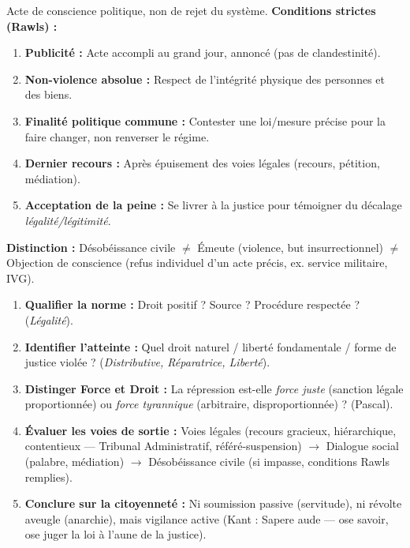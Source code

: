 \documentclass[11pt]{article}
\newcommand{\cle}[1]{{\popxbold\color{popdark}#1}}
\begin{document}
\begin{propriete}
Acte de \cle{conscience} politique, non de rejet du système. \textbf{Conditions strictes (Rawls) :}
\begin{enumerate}
    \item \textbf{Publicité :} Acte accompli au grand jour, annoncé (pas de clandestinité).
    \item \textbf{Non-violence absolue :} Respect de l'intégrité physique des personnes et des biens.
    \item \textbf{Finalité politique commune :} Contester une loi/mesure précise pour la faire changer, non renverser le régime.
    \item \textbf{Dernier recours :} Après épuisement des voies légales (recours, pétition, médiation).
    \item \textbf{Acceptation de la peine :} Se livrer à la justice pour témoigner du décalage \emph{légalité/légitimité}.
\end{enumerate}
\textbf{Distinction :} Désobéissance civile $\neq$ Émeute (violence, but insurrectionnel) $\neq$ Objection de conscience (refus individuel d'un acte précis, ex. service militaire, IVG).
\end{propriete}

\begin{methode}
\begin{enumerate}
    \item \textbf{Qualifier la norme :} Droit positif ? Source ? Procédure respectée ? (\emph{Légalité}).
    \item \textbf{Identifier l'atteinte :} Quel droit naturel / liberté fondamentale / forme de justice violée ? (\emph{Distributive, Réparatrice, Liberté}).
    \item \textbf{Distinger Force et Droit :} La répression est-elle \emph{force juste} (sanction légale proportionnée) ou \emph{force tyrannique} (arbitraire, disproportionnée) ? (Pascal).
    \item \textbf{Évaluer les voies de sortie :} Voies légales (recours gracieux, hiérarchique, contentieux — Tribunal Administratif, référé-suspension) $\to$ Dialogue social (palabre, médiation) $\to$ Désobéissance civile (si impasse, conditions Rawls remplies).
    \item \textbf{Conclure sur la citoyenneté :} Ni soumission passive (servitude), ni révolte aveugle (anarchie), mais \cle{vigilance active} (Kant : \guillemotleft Sapere aude \guillemotright — ose savoir, ose juger la loi à l'aune de la justice).
\end{enumerate}
\end{methode}
\end{document}

